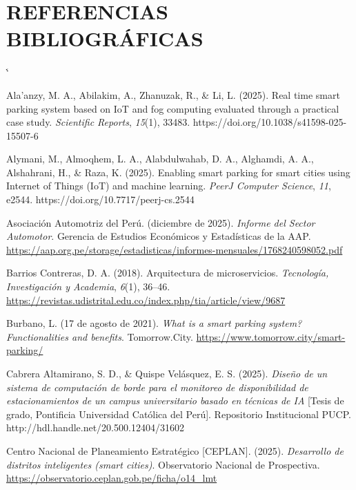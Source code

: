 \documentclass[12pt,a4paper]{article}
\makeatletter
\renewenvironment{thebibliography}[1]{%
	\list{}{%
		\setlength{\leftmargin}{1.27cm}%
		\setlength{\itemindent}{-1.27cm}%
		\setlength{\labelwidth}{0pt}%
		\setlength{\labelsep}{0pt}%
		\usecounter{enumiv}%
		\let\p@enumiv\@empty
		\renewcommand\theenumiv{\@arabic\c@enumiv}}%
	\sloppy\clubpenalty4000\widowpenalty4000\sfcode`\.\@m}
	{\endlist}
\makeatother
\begin{document}
\clearpage
\section{REFERENCIAS BIBLIOGRÁFICAS}

\begin{thebibliography}{99}
	
	Ala'anzy, M. A., Abilakim, A., Zhanuzak, R., \& Li, L. (2025).
	Real time smart parking system based on IoT and fog computing evaluated through a practical case study.
	\textit{Scientific Reports}, \textit{15}(1), 33483.
	https://doi.org/10.1038/s41598-025-15507-6
	
	Alymani, M., Almoqhem, L. A., Alabdulwahab, D. A., Alghamdi, A. A., Alshahrani, H., \& Raza, K. (2025).
	Enabling smart parking for smart cities using Internet of Things (IoT) and machine learning.
	\textit{PeerJ Computer Science}, \textit{11}, e2544.
	https://doi.org/10.7717/peerj-cs.2544
	
	Asociación Automotriz del Perú. (diciembre de 2025).
	\textit{Informe del Sector Automotor}.
	Gerencia de Estudios Económicos y Estadísticas de la AAP.
	\url{https://aap.org.pe/storage/estadisticas/informes-mensuales/1768240598052.pdf}
	
	Barrios Contreras, D. A. (2018).
	Arquitectura de microservicios.
	\textit{Tecnología, Investigación y Academia}, \textit{6}(1), 36--46.
	\url{https://revistas.udistrital.edu.co/index.php/tia/article/view/9687}
	
	Burbano, L. (17 de agosto de 2021).
	\textit{What is a smart parking system? Functionalities and benefits}.
	Tomorrow.City.
	\url{https://www.tomorrow.city/smart-parking/}
	
	Cabrera Altamirano, S. D., \& Quispe Velásquez, E. S. (2025).
	\textit{Diseño de un sistema de computación de borde para el monitoreo de disponibilidad de estacionamientos de un campus universitario basado en técnicas de IA}
	[Tesis de grado, Pontificia Universidad Católica del Perú].
	Repositorio Institucional PUCP.
	http://hdl.handle.net/20.500.12404/31602
	
	Centro Nacional de Planeamiento Estratégico [CEPLAN]. (2025).
	\textit{Desarrollo de distritos inteligentes (smart cities)}.
	Observatorio Nacional de Prospectiva.
	\url{https://observatorio.ceplan.gob.pe/ficha/o14_lmt}
	

\end{thebibliography}
\end{document}
